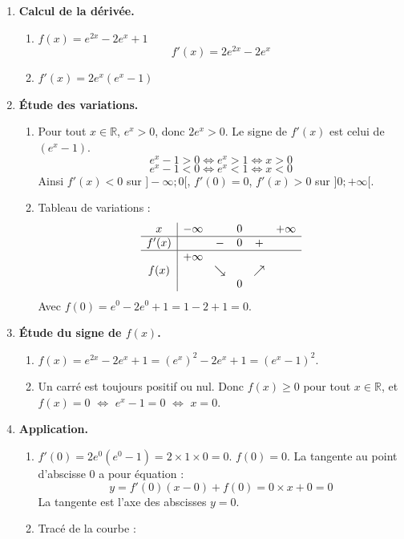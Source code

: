 \documentclass[a4paper,12pt]{article}
\begin{document}
\begin{enumerate}
\item \textbf{Calcul de la dérivée.}
\begin{enumerate}
\item $f(x) = e^{2x} - 2e^x + 1$
\[
f'(x) = 2e^{2x} - 2e^x
\]
\item $f'(x) = 2e^x(e^x - 1)$
\end{enumerate}

\item \textbf{Étude des variations.}
\begin{enumerate}
\item Pour tout $x \in \mathbb{R}$, $e^x > 0$, donc $2e^x > 0$. Le signe de $f'(x)$ est celui de $(e^x - 1)$.
\[
e^x - 1 > 0 \iff e^x > 1 \iff x > 0
\]
\[
e^x - 1 < 0 \iff e^x < 1 \iff x < 0
\]
Ainsi $f'(x) < 0$ sur $]-\infty;0[$, $f'(0)=0$, $f'(x) > 0$ sur $]0;+\infty[$.

\item Tableau de variations :
\[
\begin{array}{c|ccccc}
x & -\infty & & 0 & & +\infty \\
\hline
f'(x) & & - & 0 & + & \\
\hline
& +\infty & & & & \\
f(x) & & \searrow & & \nearrow & \\
& & & 0 & & \\
\end{array}
\]
Avec $f(0) = e^0 - 2e^0 + 1 = 1 - 2 + 1 = 0$.
\end{enumerate}

\item \textbf{Étude du signe de $f(x)$.}
\begin{enumerate}
\item $f(x) = e^{2x} - 2e^x + 1 = (e^x)^2 - 2e^x + 1 = (e^x - 1)^2$.
\item Un carré est toujours positif ou nul. Donc $f(x) \geq 0$ pour tout $x \in \mathbb{R}$, et $f(x) = 0$ $\iff$ $e^x - 1 = 0$ $\iff$ $x = 0$.
\end{enumerate}

\item \textbf{Application.}
\begin{enumerate}
\item $f'(0) = 2e^0(e^0 - 1) = 2 \times 1 \times 0 = 0$. $f(0) = 0$.
La tangente au point d'abscisse $0$ a pour équation :
\[
y = f'(0)(x - 0) + f(0) = 0 \times x + 0 = 0
\]
La tangente est l'axe des abscisses $y = 0$.

\item Tracé de la courbe :


\end{enumerate}
\end{enumerate}
\end{document}
